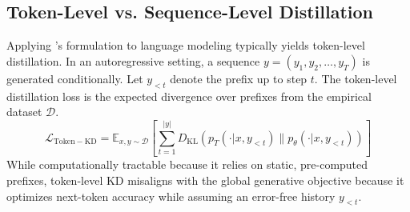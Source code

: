 \documentclass{article} %
\newcommand{\KL}{D_{\mathrm{KL}}}
\newcommand{\ptheta}{p_\theta}
\newcommand{\pteacher}{p_T}
\newcommand{\loss}{\mathcal{L}}
\begin{document}
\subsection{Token-Level vs. Sequence-Level Distillation}
\label{subsec:token_vs_sequence}

Applying \citet{hinton2015distilling}'s formulation to language modeling typically yields token-level distillation. In an autoregressive setting, a sequence $y = (y_1, y_2, \dots, y_T)$ is generated conditionally. Let $y_{<t}$ denote the prefix up to step $t$. The token-level distillation loss is the expected divergence over prefixes from the empirical dataset $\mathcal{D}$.
\begin{equation}
    \loss_{\mathrm{Token-KD}} = \mathbb{E}_{x, y \sim \mathcal{D}} \left[ \sum_{t=1}^{|y|} \KL(\pteacher(\cdot | x, y_{<t}) \parallel \ptheta(\cdot | x, y_{<t})) \right]
\end{equation}
While computationally tractable because it relies on static, pre-computed prefixes, token-level KD misaligns with the global generative objective because it optimizes next-token accuracy while assuming an error-free history $y_{<t}$.
\end{document}
